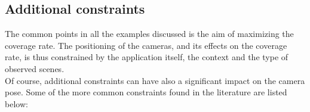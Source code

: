 \subsection{Additional constraints}
The common points in all the examples discussed is the aim of maximizing the coverage rate. The positioning of the cameras, and its effects on the coverage rate, is thus constrained by the application itself, the context  and the type of observed scenes.\\
Of course, additional constraints can have also a significant impact on the camera pose. Some of the more common constraints found in the literature are listed below:\\

